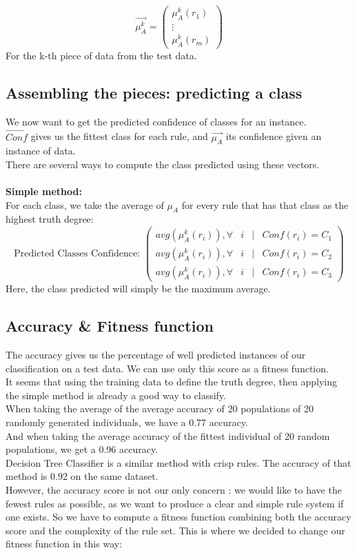 \documentclass[a4paper,12pt]{article}
\begin{document}
\[
\vec{\mu_A^k}=
\begin{pmatrix}
\mu_A^k(r_1)\\
\vdots\\
\mu_A^k(r_m)
\end{pmatrix}
\]
For the k-th piece of data from the test data.

\subsection{Assembling the pieces: predicting a class}

We now want to get the predicted confidence of classes for an instance.\\
$\vec{Conf}$ gives us the fittest class for each rule, and $\vec{\mu_A}$ its confidence given an instance of data. \\
There are several ways to compute the class predicted using these vectors.
\\
\\
\textbf{Simple method:}
\\
For each class, we take the average of $\mu_A$ for every rule that has that class as the highest truth degree:
\[
\text{Predicted Classes Confidence: }
\begin{pmatrix}
avg(\mu_A^k(r_i)), \forall & i & | & Conf(r_i)=C_1\\
avg(\mu_A^k(r_i)), \forall & i & | & Conf(r_i)=C_2\\
avg(\mu_A^k(r_i)), \forall & i & | & Conf(r_i)=C_3
\end{pmatrix}
\]
Here, the class predicted will simply be the maximum average.


\subsection{Accuracy \& Fitness function}

The accuracy gives us the percentage of well predicted instances of our classification on a test data. We can use only this score as a fitness function.\\
It seems that using the training data to define the truth degree, then applying the simple method is already a good way to classify.\\
When taking the average of the average accuracy of 20 populations of 20 randomly generated individuals, we have a 0.77 accuracy.\\
And when taking the average accuracy of the fittest individual of 20 random populations, we get a 0.96 accuracy.\\
Decision Tree Classifier is a similar method with crisp rules. The accuracy of that method is 0.92 on the same dataset.\\
However, the accuracy score is not our only concern : we would like to have the fewest rules as possible, as we want to produce a clear and simple rule system if one exists. So we have to compute a fitness function combining both the accuracy score and the complexity of the rule set.
This is where we decided to change our fitness function in this way:
\end{document}
